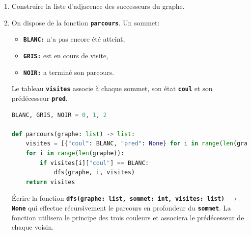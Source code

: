 \documentclass[a4paper,11pt]{article}
\begin{document}
\begin{exo}
    \begin{center}
    \end{center}
    \begin{enumerate}
        \item Construire la liste d'adjacence des successeurs du graphe.
        \item On dispose de la fonction \textbf{\texttt{parcours}}. Un sommet:
        \begin{itemize}
            \item \textbf{\texttt{BLANC:}} n'a pas encore été atteint,
            \item \textbf{\texttt{GRIS:}} est en cours de visite,
            \item \textbf{\texttt{NOIR:}} a terminé son parcours.
        \end{itemize}
        Le tableau \textbf{\texttt{visites}} associe à chaque sommet, son état \textbf{\texttt{coul}} et son prédécesseur \textbf{\texttt{pred}}.
        \begin{lstlisting}[language=Python  , xleftmargin=1em, xrightmargin=1em]
BLANC, GRIS, NOIR = 0, 1, 2

def parcours(graphe: list) -> list:
    visites = [{"coul": BLANC, "pred": None} for i in range(len(graphe))]
    for i in range(len(graphe)):
        if visites[i]["coul"] == BLANC:
            dfs(graphe, i, visites)
    return visites
\end{lstlisting}
Écrire la fonction \textbf{\texttt{dfs(graphe: list, sommet: int, visites: list) $\rightarrow$ None}} qui effectue récursivement le parcours en profondeur du \textbf{\texttt{sommet}}. La fonction utilisera le principe des trois couleurs et associera le prédécesseur de chaque voisin.
    \end{enumerate}
\end{exo}
\end{document}
